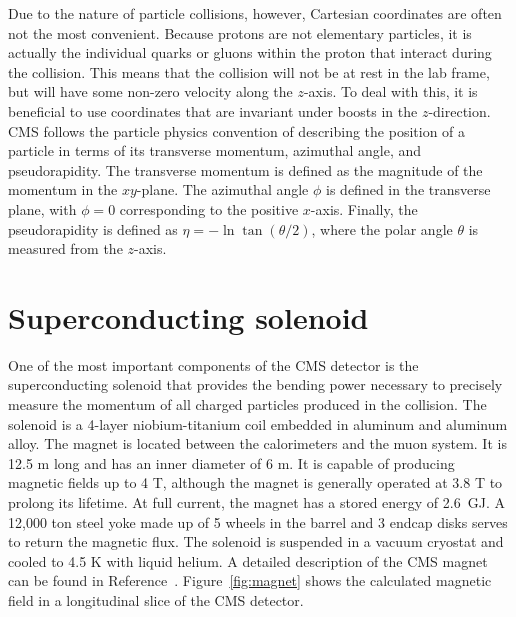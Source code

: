Due to the nature of particle collisions, however, Cartesian coordinates are often not the most convenient. Because protons are not elementary particles, it is actually the individual quarks or gluons within the proton that interact during the collision. This means that the collision will not be at rest in the lab frame, but will have some non-zero velocity along the $z$-axis. To deal with this, it is beneficial to use coordinates that are invariant under boosts in the $z$-direction. CMS follows the particle physics convention of describing the position of a particle in terms of its transverse momentum, azimuthal angle, and pseudorapidity. The transverse momentum \pt is defined as the magnitude of the momentum in the $xy$-plane. The azimuthal angle $\phi$ is defined in the transverse plane, with $\phi  = 0$ corresponding to the positive $x$-axis. Finally, the pseudorapidity is defined as $\eta = -\ln{\tan{ (\theta / 2 )} } $, where the polar angle $\theta$ is measured from the $z$-axis. 


\section{Superconducting solenoid}
\label{sec:magnet}

One of the most important components of the CMS detector is the superconducting solenoid that provides the bending power necessary to precisely measure the momentum of all charged particles produced in the collision. The solenoid is a 4-layer niobium-titanium coil embedded in aluminum and aluminum alloy. The magnet is located between the calorimeters and the muon system. It is 12.5 m long and has an inner diameter of 6 m. It is capable of producing magnetic fields up to 4 T, although the magnet is generally operated at 3.8 T to prolong its lifetime. At full current, the magnet has a stored energy of 2.6~GJ. A 12,000 ton steel yoke made up of 5 wheels in the barrel and 3 endcap disks serves to return the magnetic flux. The solenoid is suspended in a vacuum cryostat and cooled to 4.5 K with liquid helium. A detailed description of the CMS magnet can be found in Reference~\cite{magnetTDR}. Figure~\ref{fig:magnet} shows the calculated magnetic field in a longitudinal slice of the CMS detector.

